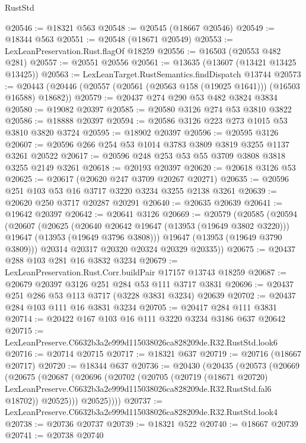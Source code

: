 \begin{lexlean}{RustStd}
\begin{coremodule}
@20546 := @18321 @563
@20548 := @20545 (@18667 @20546)
@20549 := @18344 @563
@20551 := @20548 (@18671 @20549)
@20553 := LexLeanPreservation.Rust.flagOf @18259
@20556 := @16503 (@20553 @482 @281)
@20557 := @20551 @20556
@20561 := @13635 (@13607 (@13421 @13425 @13425))
@20563 := LexLeanTarget.RustSemantics.findDispatch @13744
@20573 := @20443 (@20446 (@20557 (@20561 (@20563 @158 (@19025 @1641))) (@16503 @16588) @18682))
@20579 := @20437 @274 @290 @53 @482 @3824 @3834
@20580 := @19082 @20397
@20585 := @20580 @3126 @274 @53 @3810 @3822
@20586 := @18888 @20397
@20594 := @20586 @3126 @223 @273 @1015 @53 @3810 @3820 @3724
@20595 := @18902 @20397
@20596 := @20595 @3126
@20607 := @20596 @266 @254 @53 @1014 @3783 @3809 @3819 @3255 @1137 @3261 @20522
@20617 := @20596 @248 @253 @53 @55 @3709 @3808 @3818 @3255 @2149 @3261
@20618 := @20193 @20397
@20620 := @20618 @3126 @53
@20625 := @20617 (@20620 @247 @3709 @20267 @20271)
@20635 := @20596 @251 @103 @53 @16 @3717 @3220 @3234 @3255 @2138 @3261
@20639 := @20620 @250 @3717 @20287 @20291
@20640 := @20635 @20639
@20641 := @19642 @20397
@20642 := @20641 @3126
@20669 := @20579
    (@20585
      (@20594
        (@20607
          (@20625
            (@20640 @20642 @19647 (@13953 (@19649 @3802 @3220)))
            @19647
            (@13953 (@19649 @3796 @3808)))
          @19647
          (@13953 (@19649 @3790 @3809)))
        @20314
        @20317
        @20320
        @20324
        @20329
        @20335))
@20675 := @20437 @288 @103 @281 @16 @3832 @3234
@20679 := LexLeanPreservation.Rust.Corr.buildPair @17157 @13743 @18259
@20687 := @20679 @20397 @3126 @251 @284 @53 @111 @3717 @3831
@20696 := @20437 @251 @286 @53 @113 @3717 (@3228 @3831 @3234) @20639
@20702 := @20437 @284 @103 @111 @16 @3831 @3234
@20705 := @20417 @284 @111 @3831
@20714 := @20422 @167 @103 @16 @111 @3220 @3234 @3186 @637 @20642
@20715 := LexLeanPreserve.C6632b3a2e999d115038026ca828209de.R32.RustStd.look6
@20716 := @20714 @20715
@20717 := @18321 @637
@20719 := @20716 (@18667 @20717)
@20720 := @18344 @637
@20736 := @20430
    (@20435
      (@20573
        (@20669
          (@20675
            (@20687
              (@20696
                (@20702
                  (@20705
                    (@20719
                      (@18671 @20720)
                      LexLeanPreserve.C6632b3a2e999d115038026ca828209de.R32.RustStd.fal6
                      @18702))
                  @20525)))
            @20525))))
@20737 := LexLeanPreserve.C6632b3a2e999d115038026ca828209de.R32.RustStd.look4
@20738 := @20736 @20737
@20739 := @18321 @522
@20740 := @18667 @20739
@20741 := @20738 @20740

\end{coremodule}
\end{lexlean}
